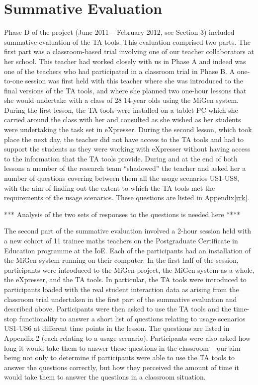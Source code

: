 
\section{Summative Evaluation}
\label{sec:summative-evaluation}

Phase D of the project (June 2011 – February 2012, see Section 3)
included summative evaluation of the TA tools. This evaluation
comprised two parts. The first part was a classroom-based trial
involving one of our teacher collaborators at her school.  This
teacher had worked closely with us in Phase A and indeed was one of
the teachers who had participated in a classroom trial in Phase B. A
one-to-one session was first held with this teacher where she was
introduced to the final versions of the TA tools, and where she
planned two one-hour lessons that she would undertake with a class of
28 14-year olds using the MiGen system. During the first lesson, the
TA tools were installed on a tablet PC which she carried around the
class with her and consulted as she wished as her students were
undertaking the task set in eXpresser. During the second lesson, which
took place the next day, the teacher did not have access to the TA
tools and had to support the students as they were working with
eXpresser without having access to the information that the TA tools
provide.  During and at the end of both lessons a member of the
research team “shadowed” the teacher and asked her a number of
questions covering between them all the usage scenarios US1-US8, with
the aim of finding out the extent to which the TA tools met the
requirements of the usage scenarios. These questions are listed in
Appendix\ref{rrk}. 
 
*** Analysis of the two sets of responses to the questions is needed
here ****


The second part of the summative evaluation involved a 2-hour session
held with a new cohort of 11 trainee maths teachers on the
Postgraduate Certificate in Education programme at the IoE. Each of
the participants had an installation of the MiGen system running on
their computer. In the first half of the session, participants were
introduced to the MiGen project, the MiGen system as a whole, the
eXpresser, and the TA tools. In particular, the TA tools were
introduced to participants loaded with the real student interaction
data as arising from the classroom trial undertaken in the first part
of the summative evaluation and described above. Participants were
then asked to use the TA tools and the time-stop functionality to
answer a short list of questions relating to usage scenarios US1-US6
at different time points in the lesson. The questions are listed in
Appendix 2 (each relating to a usage scenario). 
Participants were also asked how long it would take them to
answer these questions in the classroom – our aim being not only to
determine if participants were able to use the TA tools to answer the
questions correctly, but how they perceived the amount of time it
would take them to answer the questions in a classroom situation. 

